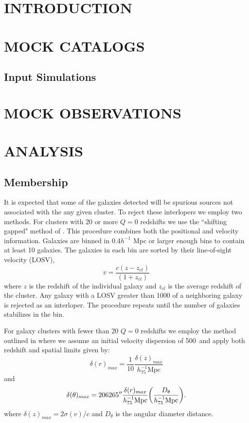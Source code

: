 \documentclass[apj, twocolappendix]{emulateapj}
\begin{document}
\section{INTRODUCTION}

\section{MOCK CATALOGS}
\subsection{Input Simulations}

\section{MOCK OBSERVATIONS}

\section{ANALYSIS}

\subsection{Membership}
It is expected that some of the galaxies detected will be spurious sources not associated with the any given cluster. To reject these interlopers we employ two methods. For clusters with 20 or more $Q=0$ redshifts we use the  ``shifting gapped" method of \cite{Fadda1996}. This procedure combines both the positional and velocity information. Galaxies are binned in $0.4h^{-1}$ Mpc or larger enough bins to contain at least 10 galaxies. The galaxies in each bin are sorted by their line-of-sight velocity (LOSV),
\begin{equation}
	v = \frac{c (z-z_{cl})}{(1+z_{cl})}
\end{equation}
where $z$ is the redshift of the individual galaxy and $z_{cl}$ is the average redshift of the cluster. Any galaxy with a LOSV greater than 1000 \kms of a neighboring galaxy is rejected as an interloper. The procedure repeats until the number of galaxies stabilizes in the bin.

For galaxy clusters with fewer than 20 $Q=0$ redshifts we employ the method outlined in \cite{Connelly2012,Wilman2005} where we assume an initial velocity dispersion of 500\kms\ and apply both redshift and spatial limits given by:
\begin{equation}
	\delta(r)_{max} = \frac{1}{10}\frac{\delta(z)_{max}}{h_{75}^{-1}\mathrm{Mpc}}
\end{equation}
and
\begin{equation}
	\delta(\theta)_{max} = 206265'' \frac{\delta(r)_{max}}{h_{75}^{-1}\mathrm{Mpc}} \bigg{(}\frac{D_{\theta}}{h_{75}^{-1}\mathrm{Mpc}} \bigg{)}.
\end{equation}
where $\delta(z)_{max} = 2\sigma(v)/c$ and $D_\theta$ is the angular diameter distance.
\end{document}

